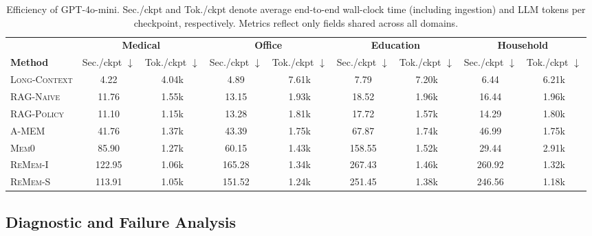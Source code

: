 \begin{table}[t]
\centering
\caption{
Efficiency of GPT-4o-mini. Sec./ckpt and Tok./ckpt denote average end-to-end wall-clock time (including ingestion) and LLM tokens per checkpoint, respectively. Metrics reflect only fields shared across all domains.}
\label{tab:cost-results}

\begingroup
\footnotesize
\setlength{\tabcolsep}{4.2pt}
\renewcommand{\arraystretch}{1.08}
\begin{tabular*}{\textwidth}{@{\extracolsep{\fill}}lcc|cc|cc|cc@{}}
\toprule
& \multicolumn{2}{c|}{\textbf{Medical}}
& \multicolumn{2}{c|}{\textbf{Office}}
& \multicolumn{2}{c|}{\textbf{Education}}
& \multicolumn{2}{c}{\textbf{Household}} \\
\cmidrule(lr){2-3}
\cmidrule(lr){4-5}
\cmidrule(lr){6-7}
\cmidrule(lr){8-9}
\textbf{Method}
& Sec./ckpt $\downarrow$ & Tok./ckpt $\downarrow$
& Sec./ckpt $\downarrow$ & Tok./ckpt $\downarrow$
& Sec./ckpt $\downarrow$ & Tok./ckpt $\downarrow$
& Sec./ckpt $\downarrow$ & Tok./ckpt $\downarrow$ \\
\midrule

\textsc{Long-Context}
& 4.22 & 4.04k
& 4.89 & 7.61k
& 7.79 & 7.20k
& 6.44 & 6.21k \\

\textsc{RAG-Naive}
& 11.76 & 1.55k
& 13.15 & 1.93k
& 18.52 & 1.96k
& 16.44 & 1.96k \\

\textsc{RAG-Policy}
& 11.10 & 1.15k
& 13.28 & 1.81k
& 17.72 & 1.57k
& 14.29 & 1.80k \\

\textsc{A-MEM}
& 41.76 & 1.37k
& 43.39 & 1.75k
& 67.87 & 1.74k
& 46.99 & 1.75k \\

\textsc{Mem0}
& 85.90 & 1.27k
& 60.15 & 1.43k
& 158.55 & 1.52k
& 29.44 & 2.91k \\

\textsc{ReMem-I}
& 122.95 & 1.06k
& 165.28 & 1.34k
& 267.43 & 1.46k
& 260.92 & 1.32k \\

\textsc{ReMem-S}
& 113.91 & 1.05k
& 151.52 & 1.24k
& 251.45 & 1.38k
& 246.56 & 1.18k \\

\bottomrule
\end{tabular*}
\endgroup
\end{table}

\subsection{Diagnostic and Failure Analysis}
\label{subsec:diagnostic-failure}

